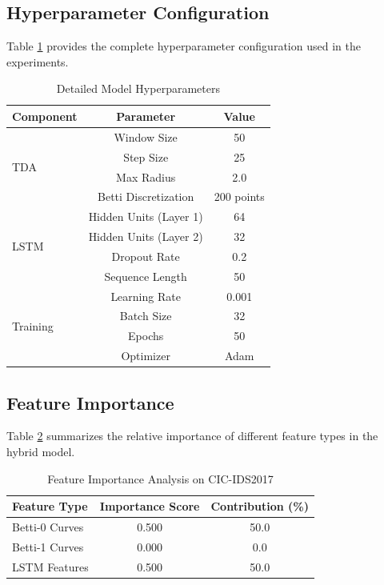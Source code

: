 \documentclass[conference]{IEEEtran}
\begin{document}
\subsection{Hyperparameter Configuration}

Table \ref{tab:hyperparameters} provides the complete hyperparameter configuration used in the experiments.

\begin{table}[htbp]
\caption{Detailed Model Hyperparameters}
\begin{center}
\begin{tabular}{|l|c|c|}
\hline
\textbf{Component} & \textbf{Parameter} & \textbf{Value} \\
\hline
\multirow{4}{*}{TDA} & Window Size & 50 \\
\cline{2-3}
& Step Size & 25 \\
\cline{2-3}
& Max Radius & 2.0 \\
\cline{2-3}
& Betti Discretization & 200 points \\
\hline
\multirow{4}{*}{LSTM} & Hidden Units (Layer 1) & 64 \\
\cline{2-3}
& Hidden Units (Layer 2) & 32 \\
\cline{2-3}
& Dropout Rate & 0.2 \\
\cline{2-3}
& Sequence Length & 50 \\
\hline
\multirow{4}{*}{Training} & Learning Rate & 0.001 \\
\cline{2-3}
& Batch Size & 32 \\
\cline{2-3}
& Epochs & 50 \\
\cline{2-3}
& Optimizer & Adam \\
\hline
\end{tabular}
\label{tab:hyperparameters}
\end{center}
\end{table}

\subsection{Feature Importance}

Table \ref{tab:feature_importance} summarizes the relative importance of different feature types in the hybrid model.

\begin{table}[htbp]
\caption{Feature Importance Analysis on CIC-IDS2017}
\begin{center}
\begin{tabular}{|l|c|c|}
\hline
\textbf{Feature Type} & \textbf{Importance Score} & \textbf{Contribution (\%)} \\
\hline
Betti-0 Curves & 0.500 & 50.0 \\
\hline
Betti-1 Curves & 0.000 & 0.0 \\
\hline
LSTM Features & 0.500 & 50.0 \\
\hline
\end{tabular}
\label{tab:feature_importance}
\end{center}
\end{table}
\end{document}
